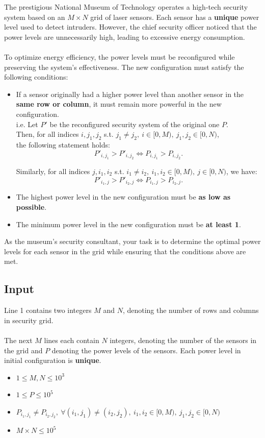 \documentclass[12pt,a4paper]{article}
\begin{document}
\noindent
The prestigious National Museum of Technology operates a high-tech security system based on an \(M \times N\) grid of laser sensors. Each sensor has a \textbf{unique} power level used to detect intruders. However, the chief security officer noticed that the power levels are unnecessarily high, leading to excessive energy consumption.
\\\\
\noindent
To optimize energy efficiency, the power levels must be reconfigured while preserving the system's effectiveness. The new configuration must satisfy the following conditions:
\begin{itemize}
    \item If a sensor originally had a higher power level than another sensor in the \textbf{same row or column}, it must remain more powerful in the new configuration.\\
    i.e. Let \( P' \) be the reconfigured security system of the original one \( P \).\\
    Then, for all indices \( i, j_1, j_2 \) s.t. \( j_1 \ne j_2,\ i\in [0,M),\ j_1,j_2\in [0,N)\),\\ the following statement holds:
    \[
    P'_{i, j_1} > P'_{i, j_2} \iff P_{i, j_1} > P_{i, j_2}.
    \]
    
    Similarly, for all indices \( j, i_1, i_2 \) s.t. \( i_1 \ne i_2,\ i_1,i_2\in [0,M),\ j\in [0,N)\), we have:
    \[
    P'_{i_1, j} > P'_{i_2, j} \iff P_{i_1, j} > P_{i_2, j}.
    \]

    \item The highest power level in the new configuration must be \textbf{as low as possible}.
    \item The minimum power level in the new configuration must be \textbf{at least 1}.
\end{itemize}

\noindent
As the museum's security consultant, your task is to determine the optimal power levels for each sensor in the grid while ensuring that the conditions above are met.

\subsection*{\fontsize{16}{12}Input}
Line 1 contains two integers \(M\) and \(N\), denoting the number of rows and columns in security grid.
\\\\
\noindent
The next \(M\) lines each contain \(N\) integers, denoting the number of the sensors in the grid and $P$ denoting the power levels of the sensors. Each power level in initial configuration is \textbf{unique}.
\begin{itemize}
    \item \(1 \leq M, N \leq 10^3\)
    \item $1\leq P \leq 10^5$
    \item $P_{i_1, j_1} \neq P_{i_2, j_2}, \ \forall (i_1, j_1) \neq (i_2, j_2),\ i_1, i_2 \in [0, M),\ j_1, j_2 \in [0, N)$
    \item \(M \times N \leq 10^5\)
\end{itemize}
\end{document}
